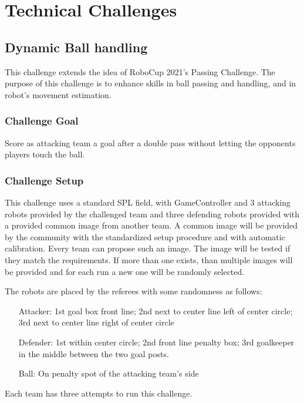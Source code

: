 \section{Technical Challenges}

\subsection{Dynamic Ball handling}

This challenge extends the idea of RoboCup 2021's Passing Challenge. The purpose of this challenge is to enhance skills in ball passing and handling, and in robot's movement estimation.

\subsubsection{Challenge Goal}

Score as attacking team a goal after a double pass without letting the opponents players touch the ball.

\subsubsection{Challenge Setup}

This challenge uses a standard SPL field, with GameController and 3 attacking robots provided by the challenged team and three defending robots provided with a provided common image from another team. A common image will be provided by the community with the standardized setup procedure and with automatic calibration. Every team can propose such an image. The image will be tested if they match the requirements. If more than one exists, than multiple images will be provided and for each run a new one will be randomly selected.

The robots are placed by the referees with some randomness as follows:
\begin{itemize}
    \item[Attacker:] 1st goal box front line; 2nd next to center line left of center circle; 3rd next to center line right of center circle
    \item[Defender:] 1st within center circle; 2nd front line penalty box; 3rd goalkeeper in the middle between the two goal posts.
    \item[Ball:] On penalty spot of the attacking team's side 
\end{itemize}

Each team has three attempts to run this challenge.

